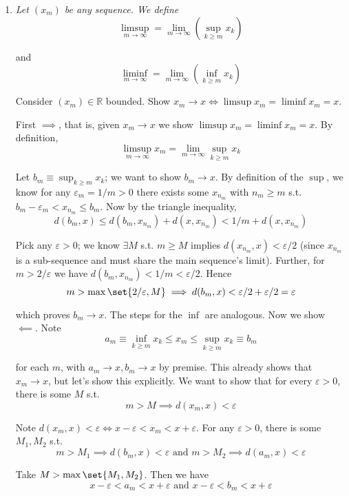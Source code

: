 \documentclass{article}
\begin{document}
\begin{enumerate}[1.]
  \item {\itshape
    Let $(x_m)$ be any sequence. We define
    \[
      \limsup_{m \to \infty} = \lim_{m \to \infty} \left(\sup_{k \ge m} x_k\right)
    \]

    and
    \[
      \liminf_{m \to \infty} = \lim_{m \to \infty} \left(\inf_{k \ge m} x_k\right)
    \]

    Consider $(x_m) \in \mathbb{R}$ bounded. Show $x_m \to x \iff \limsup x_m = \liminf x_m = x$.}

    \solution First $\implies$, that is, given $x_m \to x$ we show $\limsup x_m = \liminf x_m = x$. By definition,
    \[
      \limsup_{m \to \infty} x_m
      =
      \lim_{m \to \infty} \sup_{k \ge m} x_k
    \]

    Let $b_m \equiv \sup_{k \ge m} x_k$; we want to show $b_m \to x$. By definition of the $\sup$, we know for any $\varepsilon_m = 1/m > 0$ there exists some $x_{n_m}$ with $n_m \ge m$ s.t. $b_m - \varepsilon_m < x_{n_m} \le b_m$. Now by the triangle inequality,
    \[
      d(b_m, x) \le d(b_m, x_{n_m}) + d(x, x_{n_m}) < 1/m + d(x, x_{n_m})
    \]

    Pick any $\varepsilon > 0$; we know $\exists M$ s.t. $m \ge M$ implies $d(x_{n_m}, x) < \varepsilon/2$ (since $x_{n_m}$ is a sub-sequence and must share the main sequence's limit). Further, for $m > 2/\varepsilon$ we have $d(b_m, x_{n_m}) < 1/m < \varepsilon/2$. Hence
    \[
      m > \max\set{2/\varepsilon, M}
      \implies
      d(b_m, x) < \varepsilon/2 + \varepsilon/2 = \varepsilon
    \]

    which proves $b_m \to x$. The steps for the $\inf$ are analogous. Now we show $\impliedby$.  Note
    \[
      a_m \equiv \inf_{k \ge m} x_k \le x_m \le \sup_{k \ge m} x_k \equiv b_m
    \]

    for each $m$, with $a_m \to x, b_m \to x$  by premise. This already shows that $x_m \to x$, but let's show this explicitly. We want to show that for every $\varepsilon > 0$, there is some $M$ s.t.
    \[
      m > M \implies d(x_m, x) < \varepsilon
    \]

    Note $d(x_m, x) < \varepsilon \iff x - \varepsilon < x_m < x + \varepsilon$. For any $\varepsilon > 0$, there is some $M_1, M_2$ s.t.
    \[
      m > M_1 \implies d(b_m, x) < \varepsilon
      \text{ and }
      m > M_2 \implies d(a_m, x) < \varepsilon
    \]

    Take $M > \max\set{M_1, M_2}$. Then we have
    \[
      x - \varepsilon < a_m < x + \varepsilon
      \text{ and }
      x - \varepsilon < b_m < x + \varepsilon
    \]


\end{enumerate}
\end{document}
